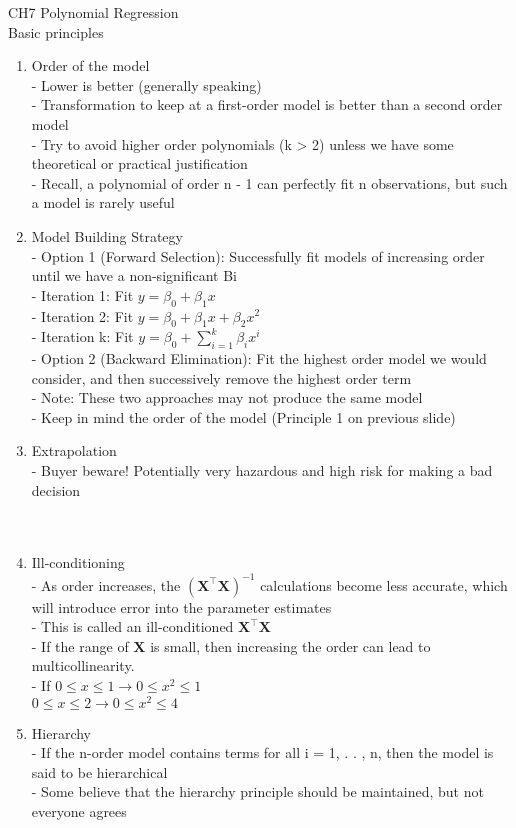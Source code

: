 \documentclass[17pt]{extarticle}%
\begin{document}
\clearpage
{\Large CH7 Polynomial Regression} \\
%
Basic principles
\begin{enumerate}
\item Order of the model\\
- Lower is better (generally speaking) \\
- Transformation to keep at a first-order model is better than a second order model \\
- Try to avoid higher order polynomials (k > 2) unless we have some theoretical or practical justification \\
- Recall, a polynomial of order n - 1 can perfectly fit n observations, but such a model is rarely useful
\item Model Building Strategy \\
- Option 1 (Forward Selection): Successfully fit models of increasing order until we have a non-significant Bi \\
- Iteration 1: Fit $y=\beta_0+\beta_1x$ \\
- Iteration 2: Fit $y=\beta_0+\beta_1x+\beta_2x^2$ \\
- Iteration k: Fit $y=\beta_0+\sum^k_{i=1}\beta_ix^i$ \\
- Option 2 (Backward Elimination): Fit the highest order model we would consider, and then successively remove the highest order term \\
- Note: These two approaches may not produce the same model \\
- Keep in mind the order of the model (Principle 1 on previous slide)
\item Extrapolation \\
- Buyer beware! Potentially very hazardous and high risk for making a bad decision \hspace{6em} \\ \\ \\
\item Ill-conditioning \\
- As order increases, the $(\mathbf{X^\top X})^{-1}$ calculations become less accurate, which will introduce error into the parameter estimates \\
- This is called an ill-conditioned $\mathbf{X^\top X}$ \\
- If the range of $\mathbf X$ is small, then increasing the order can lead to multicollinearity. \\
- If $0\leq x\leq 1 \rightarrow 0\leq x^2\leq1$\\
$0\leq x\leq 2 \rightarrow 0\leq x^2\leq4$
\item Hierarchy \\
- If the n-order model contains terms for all i = 1, . . , n, then the model is said to be hierarchical \\
- Some believe that the hierarchy principle should be maintained, but not everyone agrees
\end{enumerate}
\end{document}
